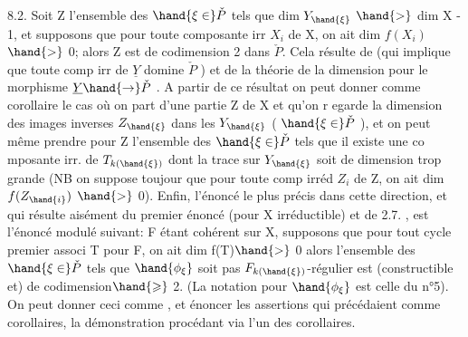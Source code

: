 
8.2. Soit Z l'ensemble des $\hand{\xi\in}\check{P}$ tels que dim $Y_{\hand{\xi}}$ $\hand{>}$ dim X - 1,\hand{\unsure{\xi}}
et supposons que pour toute composante irr $X_i$ de X, on ait dim $f(X_i)$ $\hand{>}$ 0;
alors Z est de codimension 2 dans $\check{P}$.  Cela
résulte de 
 (qui implique que toute comp irr de $\underline{Y}$ domine $\check{P}$ ) et de
la théorie de la dimension pour le morphisme $\underline{Y} \hand{\to} \check{P}$ . A partir de ce
résultat  on peut donner comme corollaire le cas où on
part d'une partie   Z de X et qu'on r egarde la dimension des
images inverses $Z_{\hand{\xi}}$ dans les $Y_{\hand{\xi}}$ ( $\hand{\xi\in}\check{P}$ ), et on peut même prendre pour
Z l'ensemble des $\hand{\xi\in}\check{P}$ tels que il existe une co mposante irr. de $T_{k(\hand{\xi})}$
dont la trace sur $Y_{\hand{\xi}}$ soit de dimension trop grande (NB on suppose toujour
que pour toute comp irréd $Z_i$ de Z, on ait dim $f(Z_{\hand{i}})$ $\hand{>}$ 0). Enfin, l'énoncé
le plus précis dans cette direction, et qui résulte aisément du premier
énoncé (pour X irréductible) et de 2.7. , est l'énoncé modulé suivant:
F étant cohérent sur X,  supposons que pour tout cycle premier associ
T pour F, on ait dim f(T)$\hand{>}$ 0\unsure{;} alors l'ensemble des $\hand{\xi\in}\check{P}$ tels que
$\hand{\phi_\xi}$  soit pas $F_{k(\hand{\xi})}$-régulier est (constructible et) de codimension$\hand{\geqslant}$ 2.
 (La notation pour $\hand{\phi_\xi}$ est celle du n°5). On peut donner ceci comme
 , et énoncer les  assertions qui précédaient
 comme corollaires, la démonstration procédant via l'un des corollaires.

